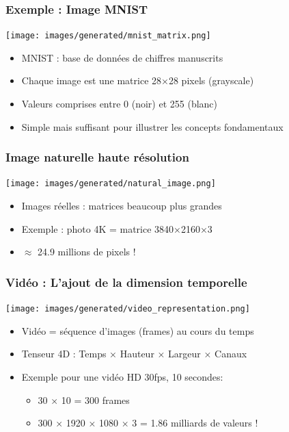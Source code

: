 \documentclass{beamer}
\begin{document}
\begin{frame}
    \frametitle{Exemple : Image MNIST}
    \begin{center}
        \texttt{[image: images/generated/mnist\_matrix.png]}
    \end{center}
    \begin{itemize}
        \item MNIST : base de données de chiffres manuscrits
        \item Chaque image est une matrice 28×28 pixels (grayscale)
        \item Valeurs comprises entre 0 (noir) et 255 (blanc)
        \item Simple mais suffisant pour illustrer les concepts fondamentaux
    \end{itemize}
\end{frame}

\begin{frame}
    \frametitle{Image naturelle haute résolution}
    \begin{center}
        \texttt{[image: images/generated/natural\_image.png]}
    \end{center}
    \begin{itemize}
        \item Images réelles : matrices beaucoup plus grandes
        \item Exemple : photo 4K = matrice 3840×2160×3
        \item \(\approx\) 24.9 millions de pixels !
    \end{itemize}
\end{frame}

\begin{frame}
    \frametitle{Vidéo : L'ajout de la dimension temporelle}
    \begin{center}
        \texttt{[image: images/generated/video\_representation.png]}
    \end{center}
    \begin{itemize}
        \item Vidéo = séquence d'images (frames) au cours du temps
        \item Tenseur 4D : Temps × Hauteur × Largeur × Canaux
        \item Exemple pour une vidéo HD 30fps, 10 secondes:
        \begin{itemize}
            \item 30 × 10 = 300 frames
            \item 300 × 1920 × 1080 × 3 = 1.86 milliards de valeurs !
        \end{itemize}
    \end{itemize}
\end{frame}
\end{document}
